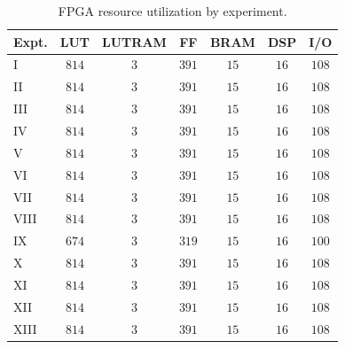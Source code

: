 \begin{table}[H]
\begin{center}
\caption[FPGA resource utilization.]{FPGA resource utilization by experiment.}
\label{tab:ru}
\begin{tabular}{|l|c|c|c|c|c|c|}
\hline
\textbf{Expt.} & \textbf{LUT} & \textbf{LUTRAM} & \textbf{FF} & \textbf{BRAM} & \textbf{DSP} & \textbf{I/O} \\
\hline
I    & $814$  & $3$ & $391$ & $15$ & $16$ & $108$       \\
\hline
II   & $814$  & $3$ & $391$ & $15$ & $16$ & $108$       \\
\hline
III  & $814$  & $3$ & $391$ & $15$ & $16$ & $108$       \\
\hline
IV   & $814$  & $3$ & $391$ & $15$ & $16$ & $108$       \\
\hline
V    & $814$  & $3$ & $391$ & $15$ & $16$ & $108$       \\
\hline
VI   & $814$  & $3$ & $391$ & $15$ & $16$ & $108$       \\
\hline
VII  & $814$  & $3$ & $391$ & $15$ & $16$ & $108$       \\
\hline
VIII & $814$  & $3$ & $391$ & $15$ & $16$ & $108$       \\
\hline
IX   & $674$  & $3$ & $319$ & $15$ & $16$ & $100$       \\
\hline
X    & $814$  & $3$ & $391$ & $15$ & $16$ & $108$       \\
\hline
XI   & $814$  & $3$ & $391$ & $15$ & $16$ & $108$       \\
\hline
XII  & $814$  & $3$ & $391$ & $15$ & $16$ & $108$       \\
\hline
XIII & $814$  & $3$ & $391$ & $15$ & $16$ & $108$       \\
\hline
\end{tabular}
\end{center}
\end{table}

\clearpage



